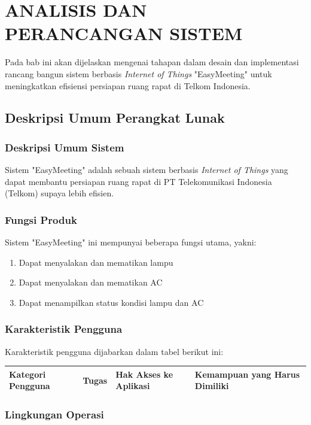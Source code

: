 \chapter{ANALISIS DAN PERANCANGAN SISTEM}
\tab Pada bab ini akan dijelaskan mengenai tahapan dalam desain dan implementasi rancang bangun sistem berbasis \textit{Internet of Things} "EasyMeeting" untuk meningkatkan efisiensi persiapan ruang rapat di Telkom Indonesia. 

\section{Deskripsi Umum Perangkat Lunak}
\subsection{Deskripsi Umum Sistem}
\tab Sistem "EasyMeeting" adalah sebuah sistem berbasis \textit{Internet of Things} yang dapat membantu persiapan ruang rapat di PT Telekomunikasi Indonesia (Telkom) supaya lebih efisien. 

\subsection{Fungsi Produk}
\tab Sistem "EasyMeeting" ini mempunyai beberapa fungsi utama, yakni:
\begin{enumerate}
	\item Dapat menyalakan dan mematikan lampu
	\item Dapat menyalakan dan mematikan AC
	\item Dapat menampilkan status kondisi lampu dan AC
\end{enumerate}

\subsection{Karakteristik Pengguna}
\indent Karakteristik pengguna dijabarkan dalam tabel berikut ini:

\begin{center}
\begin{tabular}{ | m{2cm} | m{3cm} | m{2cm} | m{3cm} | }
\hline
Kategori Pengguna& Tugas& Hak Akses ke Aplikasi& Kemampuan yang Harus Dimiliki \\
\hline


\end{tabular}
\end{center}


\subsection{Lingkungan Operasi}
